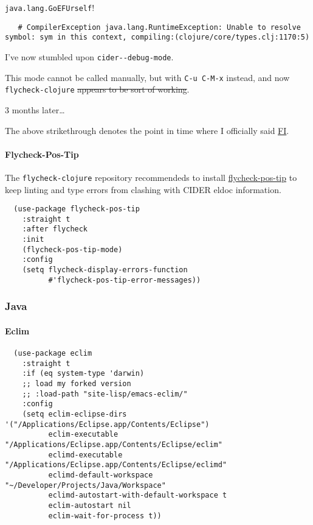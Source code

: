 \documentclass[11pt]{article}
\begin{document}
\texttt{java.lang.GoEFUrself}!

\begin{verbatim}
   # CompilerException java.lang.RuntimeException: Unable to resolve symbol: sym in this context, compiling:(clojure/core/types.clj:1170:5)
\end{verbatim}

I've now stumbled upon \texttt{cider-{}-debug-mode}.

This mode cannot be called manually, but with \texttt{C-u C-M-x} instead,
and now \texttt{flycheck-clojure} \sout{appears to be sort of working}.

3 months later\ldots{}

The above strikethrough denotes the point in time where I officially
said \href{https://www.si.com/nba/2017/05/16/steve-kerr-sneakers-message}{FI}.

\paragraph*{Flycheck-Pos-Tip}
\label{sec:org1fd11dc}

The \texttt{flycheck-clojure} repository recommendeds to install
\href{https://github.com/flycheck/flycheck-pos-tip}{flycheck-pos-tip} to keep linting and type errors from clashing with
CIDER eldoc information.

\begin{verbatim}
  (use-package flycheck-pos-tip
    :straight t
    :after flycheck
    :init
    (flycheck-pos-tip-mode)
    :config
    (setq flycheck-display-errors-function
          #'flycheck-pos-tip-error-messages))
\end{verbatim}

\subsubsection*{Java}
\label{sec:org3034dcb}
\paragraph*{Eclim}
\label{sec:org88b9eb3}

\begin{verbatim}
  (use-package eclim
    :straight t
    :if (eq system-type 'darwin)
    ;; load my forked version
    ;; :load-path "site-lisp/emacs-eclim/"
    :config
    (setq eclim-eclipse-dirs '("/Applications/Eclipse.app/Contents/Eclipse")
          eclim-executable "/Applications/Eclipse.app/Contents/Eclipse/eclim"
          eclimd-executable "/Applications/Eclipse.app/Contents/Eclipse/eclimd"
          eclimd-default-workspace "~/Developer/Projects/Java/Workspace"
          eclimd-autostart-with-default-workspace t
          eclim-autostart nil
          eclim-wait-for-process t))
\end{verbatim}
\end{document}
